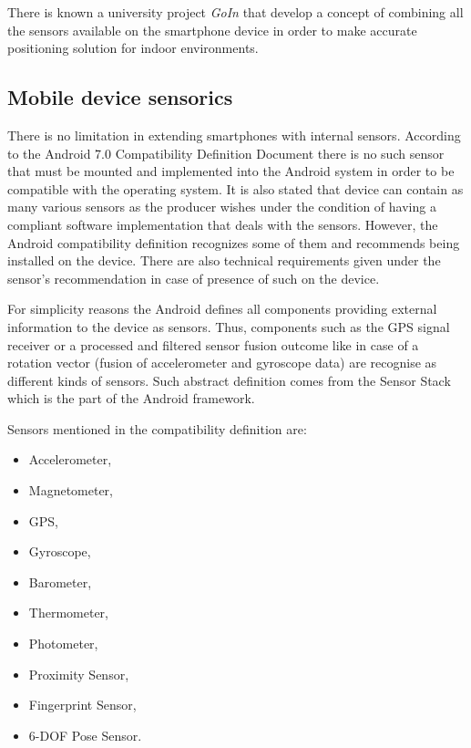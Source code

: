 \documentclass[../main.tex]{subfiles}
\begin{document}
There is known a university project \textit{GoIn} \cite{article_smartphone_features_for_indoor_positioning} that develop a concept of combining all the sensors available on the smartphone device in order to make accurate positioning solution for indoor environments.


\subsection{Mobile device sensorics}

There is no limitation in extending smartphones with internal sensors. According to the Android 7.0 Compatibility Definition Document\cite{android7.0_cdd} there is no such sensor that must be mounted and implemented into the Android system in order to be compatible with the operating system. It is also stated that device can contain as many various sensors as the producer wishes under the condition of having a compliant software implementation that deals with the sensors. However, the Android compatibility definition recognizes some of them and recommends being installed on the device. There are also technical requirements given under the sensor's recommendation in case of presence of such on the device.

For simplicity reasons the Android defines all components providing external information to the device as sensors. Thus, components such as the GPS signal receiver or a processed and filtered sensor fusion outcome like in case of a rotation vector (fusion of accelerometer and gyroscope data) are recognise as different kinds of sensors. Such abstract definition comes from the Sensor Stack which is the part of the Android framework.

Sensors mentioned in the compatibility definition are:
\begin{itemize}
 	\item Accelerometer,
	\item Magnetometer,
	\item GPS,
	\item Gyroscope,
	\item Barometer,
	\item Thermometer,
	\item Photometer,
	\item Proximity Sensor,
	\item Fingerprint Sensor,
	\item 6-DOF Pose Sensor.
 \end{itemize}
\end{document}
